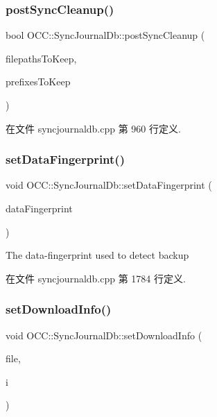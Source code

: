 \subsubsection{\texorpdfstring{post\+Sync\+Cleanup()}{postSyncCleanup()}}
{\footnotesize\ttfamily bool O\+C\+C\+::\+Sync\+Journal\+Db\+::post\+Sync\+Cleanup (\begin{DoxyParamCaption}\item[{const Q\+Set$<$ Q\+String $>$ \&}]{filepaths\+To\+Keep,  }\item[{const Q\+Set$<$ Q\+String $>$ \&}]{prefixes\+To\+Keep }\end{DoxyParamCaption})}



在文件 syncjournaldb.\+cpp 第 960 行定义.

\mbox{\label{class_o_c_c_1_1_sync_journal_db_a7ce0cd84162e54d80d4b702dad8bc741}} 
\subsubsection{\texorpdfstring{set\+Data\+Fingerprint()}{setDataFingerprint()}}
{\footnotesize\ttfamily void O\+C\+C\+::\+Sync\+Journal\+Db\+::set\+Data\+Fingerprint (\begin{DoxyParamCaption}\item[{const Q\+Byte\+Array \&}]{data\+Fingerprint }\end{DoxyParamCaption})}

The data-\/fingerprint used to detect backup 

在文件 syncjournaldb.\+cpp 第 1784 行定义.

\mbox{\label{class_o_c_c_1_1_sync_journal_db_ae9abb5e0f59f6df27f42153cd1df6944}} 
\subsubsection{\texorpdfstring{set\+Download\+Info()}{setDownloadInfo()}}
{\footnotesize\ttfamily void O\+C\+C\+::\+Sync\+Journal\+Db\+::set\+Download\+Info (\begin{DoxyParamCaption}\item[{const Q\+String \&}]{file,  }\item[{const \hyperlink{struct_o_c_c_1_1_sync_journal_db_1_1_download_info}{Download\+Info} \&}]{i }\end{DoxyParamCaption})}



